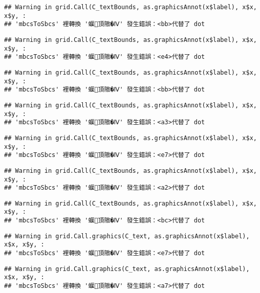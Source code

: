 \documentclass[
]{article}
\begin{document}
\begin{verbatim}
## Warning in grid.Call(C_textBounds, as.graphicsAnnot(x$label), x$x, x$y, :
## 'mbcsToSbcs' 裡轉換 '蝘頂隞�Ⅳ' 發生錯誤：<bb>代替了 dot
\end{verbatim}

\begin{verbatim}
## Warning in grid.Call(C_textBounds, as.graphicsAnnot(x$label), x$x, x$y, :
## 'mbcsToSbcs' 裡轉換 '蝘頂隞�Ⅳ' 發生錯誤：<e4>代替了 dot
\end{verbatim}

\begin{verbatim}
## Warning in grid.Call(C_textBounds, as.graphicsAnnot(x$label), x$x, x$y, :
## 'mbcsToSbcs' 裡轉換 '蝘頂隞�Ⅳ' 發生錯誤：<bb>代替了 dot
\end{verbatim}

\begin{verbatim}
## Warning in grid.Call(C_textBounds, as.graphicsAnnot(x$label), x$x, x$y, :
## 'mbcsToSbcs' 裡轉換 '蝘頂隞�Ⅳ' 發生錯誤：<a3>代替了 dot
\end{verbatim}

\begin{verbatim}
## Warning in grid.Call(C_textBounds, as.graphicsAnnot(x$label), x$x, x$y, :
## 'mbcsToSbcs' 裡轉換 '蝘頂隞�Ⅳ' 發生錯誤：<e7>代替了 dot
\end{verbatim}

\begin{verbatim}
## Warning in grid.Call(C_textBounds, as.graphicsAnnot(x$label), x$x, x$y, :
## 'mbcsToSbcs' 裡轉換 '蝘頂隞�Ⅳ' 發生錯誤：<a2>代替了 dot
\end{verbatim}

\begin{verbatim}
## Warning in grid.Call(C_textBounds, as.graphicsAnnot(x$label), x$x, x$y, :
## 'mbcsToSbcs' 裡轉換 '蝘頂隞�Ⅳ' 發生錯誤：<bc>代替了 dot
\end{verbatim}

\begin{verbatim}
## Warning in grid.Call.graphics(C_text, as.graphicsAnnot(x$label), x$x, x$y, :
## 'mbcsToSbcs' 裡轉換 '蝘頂隞�Ⅳ' 發生錯誤：<e7>代替了 dot
\end{verbatim}

\begin{verbatim}
## Warning in grid.Call.graphics(C_text, as.graphicsAnnot(x$label), x$x, x$y, :
## 'mbcsToSbcs' 裡轉換 '蝘頂隞�Ⅳ' 發生錯誤：<a7>代替了 dot
\end{verbatim}
\end{document}
